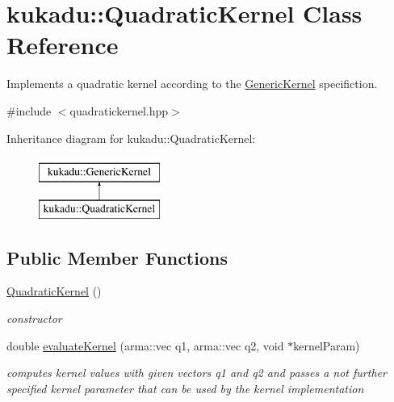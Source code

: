 \hypertarget{classkukadu_1_1QuadraticKernel}{\section{kukadu\-:\-:Quadratic\-Kernel Class Reference}
\label{classkukadu_1_1QuadraticKernel}
}


Implements a quadratic kernel according to the \hyperlink{classkukadu_1_1GenericKernel}{Generic\-Kernel} specifiction.  




{\ttfamily \#include $<$quadratickernel.\-hpp$>$}

Inheritance diagram for kukadu\-:\-:Quadratic\-Kernel\-:\begin{figure}[H]
\begin{center}
\leavevmode
\includegraphics[height=2.000000cm]{classkukadu_1_1QuadraticKernel}
\end{center}
\end{figure}
\subsection*{Public Member Functions}
\begin{DoxyCompactItemize}
\item 
\hypertarget{classkukadu_1_1QuadraticKernel_a8222d39cddab25c2d23b7ada7930c9ce}{\hyperlink{classkukadu_1_1QuadraticKernel_a8222d39cddab25c2d23b7ada7930c9ce}{Quadratic\-Kernel} ()}\label{classkukadu_1_1QuadraticKernel_a8222d39cddab25c2d23b7ada7930c9ce}

\begin{DoxyCompactList}\small\item\em constructor \end{DoxyCompactList}\item 
double \hyperlink{classkukadu_1_1QuadraticKernel_ac9a3385e7532ed38dcdcc0ee4acea035}{evaluate\-Kernel} (arma\-::vec q1, arma\-::vec q2, void $\ast$kernel\-Param)
\begin{DoxyCompactList}\small\item\em computes kernel values with given vectors q1 and q2 and passes a not further specified kernel parameter that can be used by the kernel implementation \end{DoxyCompactList}\end{DoxyCompactItemize}


